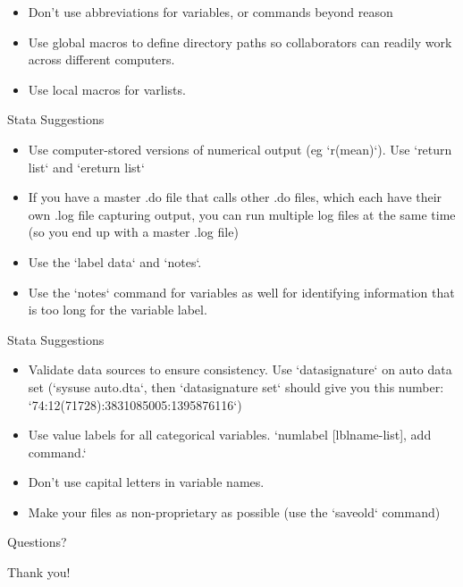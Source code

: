\documentclass{beamer}
\begin{document}
\begin{frame}
 \begin{itemize}
\item	Don't use abbreviations for variables, or commands beyond reason
\item	Use global macros to define directory paths so collaborators can readily work across different computers.
\item	Use local macros for varlists.
\end{itemize}
\end{frame}


\begin{frame}{Stata Suggestions}
\begin{itemize}
\item Use computer-stored versions of numerical output (eg `r(mean)`). Use `return list` and `ereturn list`
\item	If you have a master .do file that calls other .do files, which each have their own .log file capturing output, you can run multiple log files at the same time (so you end up with a master .log file)
\item	Use the `label data` and `notes`.
\item	Use the `notes` command for variables as well for identifying information that is too long for the variable label.
\end{itemize}
\end{frame}


\begin{frame}{Stata Suggestions}
\begin{itemize}
\item	Validate data sources to ensure consistency. Use `datasignature` on auto data set (`sysuse auto.dta`, then `datasignature set` should give you this number: `74:12(71728):3831085005:1395876116`) 
\item	Use value labels for all categorical variables. `numlabel [lblname-list], add command.`  
\item	Don't use capital letters in variable names.
\item	Make your files as non-proprietary as possible (use the `saveold` command) 

\end{itemize}
\end{frame}


\begin{frame}
\begin{center}
Questions?
\vspace{1in}


\Huge{Thank you!}
\end{center}
\end{frame}
\end{document}
